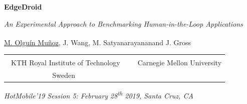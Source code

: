 \documentclass[aspectratio=1610, notes]{beamer}
\newcommand{\kthaffil}{\textsuperscript{\textdagger}}
\newcommand{\cmuaffil}{\textsuperscript{\textdaggerdbl}}
\begin{document}
\startpage
\begin{frame}{}
    \begin{center}
        \begin{LARGE}
            \textbf{EdgeDroid}\\
        \end{LARGE}
        \emph{An Experimental Approach to Benchmarking Human-in-the-Loop Applications}\\
        \vspace{0.02\textheight}
        {%
            \footnotesize%
            \underline{M. Olguín Muñoz}\kthaffil, J. Wang\cmuaffil, M. Satyanarayanan\cmuaffil and J. Gross\kthaffil\\
            \vspace{0.02\textheight}
            \begin{tabular}{@{}ccc@{}}
                \kthaffil~KTH Royal Institute of Technology
                & & \cmuaffil~Carnegie Mellon University\\
                Sweden & &     
            \end{tabular}
        }
    \end{center}

    \vspace{0.04\textheight}

    \begin{tiny}
        \raggedleft%
        \emph{HotMobile'19 Session 5: February 28\textsuperscript{th} 2019, Santa Cruz, CA}\\
    \end{tiny}
\end{frame}

\normalpage%
\end{document}

